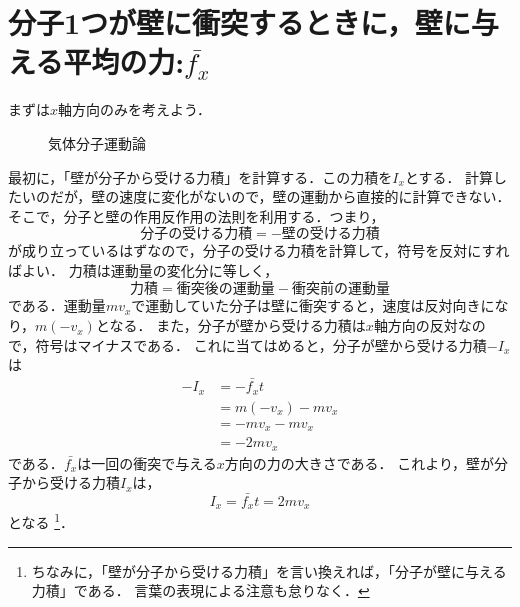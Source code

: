     \section{分子1つが壁に衝突するときに，壁に与える平均の力:$\bar{{f}_{x}}$}
    まずは$x$軸方向のみを考えよう．
    \begin{figure}[hbt]
        \begin{center}
            \caption{気体分子運動論}
            \label{fig:netsurikigaku_bunsi_undo_ron}
        \end{center}
    \end{figure}

    最初に，「壁が分子から受ける力積」を計算する．この力積を${I}_{x}$とする．
    計算したいのだが，壁の速度に変化がないので，壁の運動から直接的に計算できない．
    そこで，分子と壁の作用反作用の法則を利用する．つまり，
        \[
            \mbox{分子の受ける力積} = - \mbox{壁の受ける力積}
        \]
    が成り立っているはずなので，分子の受ける力積を計算して，符号を反対にすればよい．
    力積は運動量の変化分に等しく，
        \[
            \mbox{力積} = \mbox{衝突後の運動量} - \mbox{衝突前の運動量}
        \]
    である．運動量$m{v}_{x}$で運動していた分子は壁に衝突すると，速度は反対向きになり，$m(-{v}_{x})$となる．
    また，分子が壁から受ける力積は$x$軸方向の反対なので，符号はマイナスである．
    これに当てはめると，分子が壁から受ける力積$-{I}_{x}$は
    \begin{align*}
        - {I}_{x}   &= - \bar{{f}_{x}}  t     \\
                    &= m(-{v}_{x}) - m{v}_{x} \\
                    &= -m{v}_{x} - m{v}_{x}   \\
                    &= -2m{v}_{x}
    \end{align*}
    である．$\bar{{f}_{x}}$は一回の衝突で与える$x$方向の力の大きさである．
    これより，壁が分子から受ける力積${I}_{x}$は，
    \begin{equation}
        {I}_{x} = \bar{{f}_{x}}  t = 2m{v}_{x}
    \end{equation}
    となる
        \footnote{
            ちなみに，「壁が分子から受ける力積」を言い換えれば，「分子が壁に与える力積」である．
            言葉の表現による注意も怠りなく．
        }．

